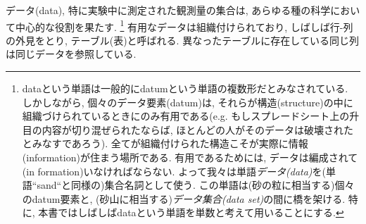 
データ(data), 特に実験中に測定された観測量の集合は, あらゆる種の科学において中心的な役割を果たす.
\footnote{dataという単語は一般的にdatumという単語の複数形だとみなされている. しかしながら, 個々のデータ要素(datum)は, それらが構造(structure)の中に組織づけられているときにのみ有用である(e.g. もしスプレードシート上の升目の内容が切り混ぜられたならば, ほとんどの人がそのデータは破壊されたとみなすであろう). 全てが組織付けられた構造こそが実際に情報(information)が住まう場所である. 有用であるためには, データは編成されて(in formation)いなければならない. よって我々は単語\emph{データ(data)}を(単語``sand``と同様の)集合名詞として使う. この単語は(砂の粒に相当する)個々のdatum要素と, (砂山に相当する)\emph{データ集合(data set)}の間に橋を架ける. 特に, 本書ではしばしばdataという単語を単数と考えて用いることにする.}
有用なデータは組織付けられており, しばしば行-列の外見をとり, テーブル(表)と呼ばれる. 異なったテーブルに存在している同じ列は同じデータを参照している.


